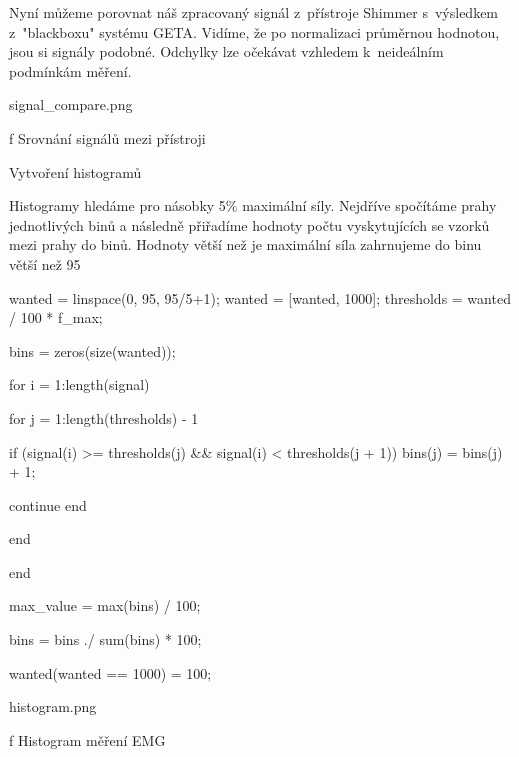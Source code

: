 Nyní můžeme porovnat náš zpracovaný signál z~přístroje Shimmer s~výsledkem z~"blackboxu" systému GETA. Vidíme, že po normalizaci průměrnou hodnotou, jsou si signály podobné. Odchylky lze očekávat vzhledem k~neideálním podmínkám měření.

\midinsert
{}
\picheight=8cm \cinspic signal_compare.png
\caption/f Srovnání signálů mezi přístroji
\endinsert

\sec Vytvoření histogramů

Histogramy hledáme pro násobky 5\% maximální síly. Nejdříve spočítáme prahy jednotlivých binů a následně přiřadíme hodnoty počtu vyskytujících se vzorků mezi prahy do binů. Hodnoty větší než je maximální síla zahrnujeme do binu větší než 95%

\begtt
wanted = linspace(0, 95, 95/5+1);
wanted = [wanted, 1000];
thresholds = wanted / 100 * f_max;

bins = zeros(size(wanted));

for i = 1:length(signal)

    for j = 1:length(thresholds) - 1

        if (signal(i) >= thresholds(j) && signal(i) < thresholds(j + 1))
            bins(j) = bins(j) + 1;

            continue
        end

    end

end

max_value = max(bins) / 100;

bins = bins ./ sum(bins) * 100;

wanted(wanted == 1000) = 100;
\endtt

\midinsert
{}
\picheight=8cm \cinspic histogram.png
\caption/f Histogram měření EMG
\endinsert
